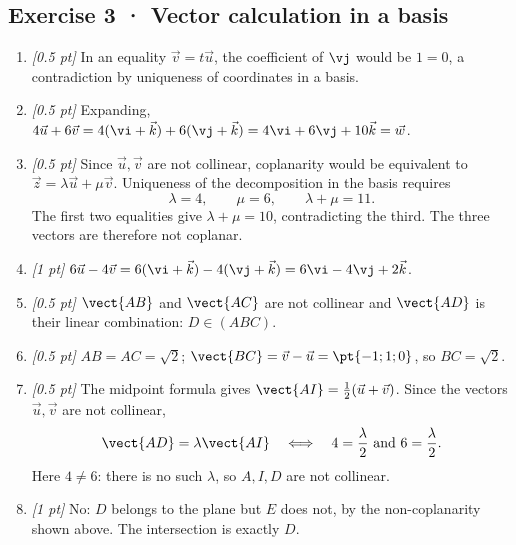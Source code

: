 \subsection*{Exercise 3 · Vector calculation in a basis}\begin{enumerate}

\item \textit{[0.5 pt]} In an equality $\vec v=t\vec u$, the coefficient of $\vj $ would be $1=0$, a contradiction by uniqueness of coordinates in a basis.

\item \textit{[0.5 pt]} Expanding, $4\vec u+6\vec v=4(\vi +\vec k)+6(\vj +\vec k)=4\vi +6\vj +10\vec k=\vec w$.

\item \textit{[0.5 pt]} Since $\vec u,\vec v$ are not collinear, coplanarity would be equivalent to $\vec z=\lambda\vec u+\mu\vec v$. Uniqueness of the decomposition in the basis requires
\[\lambda=4,\qquad\mu=6,\qquad\lambda+\mu=11.\]
The first two equalities give $\lambda+\mu=10$, contradicting the third. The three vectors are therefore not coplanar.

\item \textit{[1 pt]} $6\vec u-4\vec v=6(\vi +\vec k)-4(\vj +\vec k)=6\vi -4\vj +2\vec k$.

\item \textit{[0.5 pt]} $\vect{AB}$ and $\vect{AC}$ are not collinear and $\vect{AD}$ is their linear combination: $D\in(ABC)$.

\item \textit{[0.5 pt]} $AB=AC=\sqrt2$; $\vect{BC}=\vec v-\vec u=\pt{-1;1;0}$, so $BC=\sqrt2$.

\item \textit{[0.5 pt]} The midpoint formula gives $\vect{AI}=\frac12(\vec u+\vec v)$. Since the vectors $\vec u,\vec v$ are not collinear,
\[\vect{AD}=\lambda\vect{AI}\quad\Longleftrightarrow\quad 4=\frac{\lambda}{2}\ \text{and}\ 6=\frac{\lambda}{2}.\]
Here $4\ne 6$: there is no such $\lambda$, so $A,I,D$ are not collinear.

\item \textit{[1 pt]} No: $D$ belongs to the plane but $E$ does not, by the non-coplanarity shown above. The intersection is exactly $D$.

\end{enumerate}

